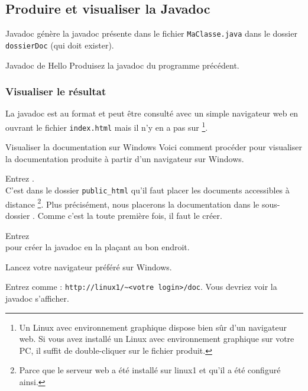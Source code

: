 \documentclass[a4paper,11pt]{style-esi/td}
\begin{document}
	\subsection{Produire et visualiser la Javadoc}

		\begin{theorie}{Javadoc}
			génère la javadoc présente dans le fichier \texttt{MaClasse.java}
			dans le dossier \texttt{dossierDoc} (qui doit exister).
		\end{theorie}

		\begin{Exercice}{Javadoc de Hello}
			Produisez la javadoc du programme  précédent.
		\end{Exercice}

		\subsubsection*{Visualiser le résultat}

		La javadoc est au format  et peut être consulté
		avec un simple navigateur web en ouvrant le fichier \verb|index.html|
		mais il n'y en a pas sur %
		\footnote{%
			Un Linux avec environnement graphique 
			dispose bien sûr d'un navigateur web.
			Si vous avez installé un Linux avec environnement graphique
			sur votre PC, il suffit de double-cliquer sur le fichier
			 produit.
		}.

		\begin{Tutoriel}{Visualiser la documentation sur Windows}
			Voici comment procéder pour visualiser la documentation
			produite à partir d'un navigateur sur Windows.
			\begin{steps}
			\item 
				Entrez .
				\\
				C'est dans le dossier \verb|public_html|
				qu'il faut placer les documents accessibles à distance%
				\footnote{%
					Parce que le serveur web  a été installé
					sur linux1 et qu'il a été configuré ainsi.
				}.
				Plus précisément, nous placerons la documentation
				dans le sous-dossier .
				Comme c'est la toute première fois, il faut le créer.
			\item 
				Entrez 
				\\pour créer la javadoc en la plaçant au bon endroit.
			\item 
				Lancez votre navigateur préféré sur Windows.
			\item 
				Entrez comme  : \verb|http://linux1/~<votre login>/doc|.
				Vous devriez voir la javadoc s'afficher.
			\end{steps}
		\end{Tutoriel}
\end{document}
